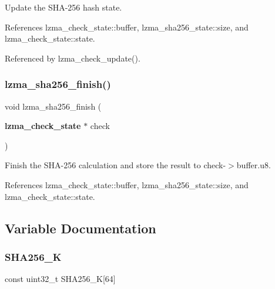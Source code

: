 Update the S\+H\+A-\/256 hash state. 



References lzma\+\_\+check\+\_\+state\+::buffer, lzma\+\_\+sha256\+\_\+state\+::size, and lzma\+\_\+check\+\_\+state\+::state.



Referenced by lzma\+\_\+check\+\_\+update().

\mbox{\label{sha256_8c_aa53f5151949f03053bc08425e87a4df5}} 
\subsubsection{lzma\+\_\+sha256\+\_\+finish()}
{\footnotesize\ttfamily void lzma\+\_\+sha256\+\_\+finish (\begin{DoxyParamCaption}\item[{\textbf{ lzma\+\_\+check\+\_\+state} $\ast$}]{check }\end{DoxyParamCaption})}



Finish the S\+H\+A-\/256 calculation and store the result to check-\/$>$buffer.\+u8. 



References lzma\+\_\+check\+\_\+state\+::buffer, lzma\+\_\+sha256\+\_\+state\+::size, and lzma\+\_\+check\+\_\+state\+::state.



\subsection{Variable Documentation}
\mbox{\label{sha256_8c_ab8f3ad1f1c5d0564c306a6714b2e4d08}} 
\subsubsection{S\+H\+A256\+\_\+K}
{\footnotesize\ttfamily const uint32\+\_\+t S\+H\+A256\+\_\+K[64]\hspace{0.3cm}{\ttfamily [static]}}

